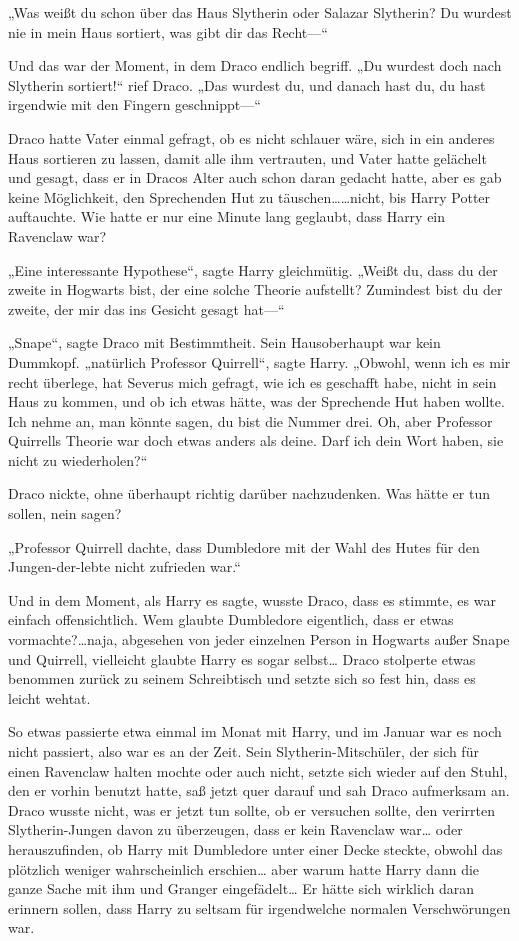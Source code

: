 {„Was weißt du schon über das Haus Slytherin oder Salazar Slytherin? Du wurdest nie in mein Haus sortiert, was gibt dir das Recht—“

Und das war der Moment, in dem Draco endlich begriff. „Du wurdest doch nach Slytherin sortiert!“ rief Draco. „Das wurdest du, und danach hast du, du hast irgendwie mit den Fingern geschnippt—“

Draco hatte Vater einmal gefragt, ob es nicht schlauer wäre, sich in ein anderes Haus sortieren zu lassen, damit alle ihm vertrauten, und Vater hatte gelächelt und gesagt, dass er in Dracos Alter auch schon daran gedacht hatte, aber es gab keine Möglichkeit, den Sprechenden Hut zu täuschen……nicht, bis Harry Potter auftauchte. Wie hatte er nur eine Minute lang geglaubt, dass Harry ein Ravenclaw war?

„Eine interessante Hypothese“, sagte Harry gleichmütig. „Weißt du, dass du der zweite in Hogwarts bist, der eine solche Theorie aufstellt? Zumindest bist du der zweite, der mir das ins Gesicht gesagt hat—“

„Snape“, sagte Draco mit Bestimmtheit. Sein Hausoberhaupt war kein Dummkopf. „natürlich Professor Quirrell“, sagte Harry. „Obwohl, wenn ich es mir recht überlege, hat Severus mich gefragt, wie ich es geschafft habe, nicht in sein Haus zu kommen, und ob ich etwas hätte, was der Sprechende Hut haben wollte. Ich nehme an, man könnte sagen, du bist die Nummer drei. Oh, aber Professor Quirrells Theorie war doch etwas anders als deine. Darf ich dein Wort haben, sie nicht zu wiederholen?“

Draco nickte, ohne überhaupt richtig darüber nachzudenken. Was hätte er tun sollen, nein sagen?

„Professor Quirrell dachte, dass Dumbledore mit der Wahl des Hutes für den Jungen-der-lebte nicht zufrieden war.“

Und in dem Moment, als Harry es sagte, wusste Draco, dass es stimmte, es war einfach offensichtlich. Wem glaubte Dumbledore eigentlich, dass er etwas vormachte?…naja, abgesehen von jeder einzelnen Person in Hogwarts außer Snape und Quirrell, vielleicht glaubte Harry es sogar selbst… Draco stolperte etwas benommen zurück zu seinem Schreibtisch und setzte sich so fest hin, dass es leicht wehtat.

So etwas passierte etwa einmal im Monat mit Harry, und im Januar war es noch nicht passiert, also war es an der Zeit. Sein Slytherin-Mitschüler, der sich für einen Ravenclaw halten mochte oder auch nicht, setzte sich wieder auf den Stuhl, den er vorhin benutzt hatte, saß jetzt quer darauf und sah Draco aufmerksam an. Draco wusste nicht, was er jetzt tun sollte, ob er versuchen sollte, den verirrten Slytherin-Jungen davon zu überzeugen, dass er kein Ravenclaw war… oder herauszufinden, ob Harry mit Dumbledore unter einer Decke steckte, obwohl das plötzlich weniger wahrscheinlich erschien… aber warum hatte Harry dann die ganze Sache mit ihm und Granger eingefädelt… Er hätte sich wirklich daran erinnern sollen, dass Harry zu seltsam für irgendwelche normalen Verschwörungen war.

}

